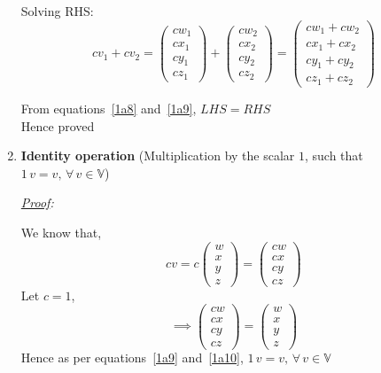 \documentclass[12pt, letterpaper]{article}
\begin{document}
\begin{enumerate}
  Solving RHS:
  \begin{equation}
  \label{1a9}
    cv_1 + cv_2
    = \begin{pmatrix}cw_1\\cx_1\\cy_1\\cz_1\end{pmatrix} + \begin{pmatrix}cw_2\\cx_2\\cy_2\\cz_2\end{pmatrix}
    = \begin{pmatrix}cw_1 + cw_2\\cx_1 + cx_2\\cy_1 + cy_2\\cz_1 + cz_2\end{pmatrix}
  \end{equation}

  From equations~\ref{1a8} and~\ref{1a9}, $\boxed{LHS = RHS}$
  \\Hence proved

\item \textbf{Identity operation}
  (Multiplication by the scalar $1$, such that $1\,v = v, \, \forall \, v \in \mathbb{V}$)

\textit{\underline{Proof}:}

  We know that,
  \begin{equation}
  \label{1a10}
    cv = c\begin{pmatrix}w\\x\\y\\z\end{pmatrix}
    = \begin{pmatrix}cw\\cx\\cy\\cz\end{pmatrix}
  \end{equation}
  \label{1a11}
  Let $c = 1$,
  \begin{equation}
    \implies \begin{pmatrix}cw\\cx\\cy\\cz\end{pmatrix} = \begin{pmatrix}w\\x\\y\\z\end{pmatrix}
  \end{equation}
  Hence as per equations~\ref{1a9} and~\ref{1a10}, $\boxed{1\,v = v, \, \forall \, v \in \mathbb{V}}$

\end{enumerate}
\end{document}
